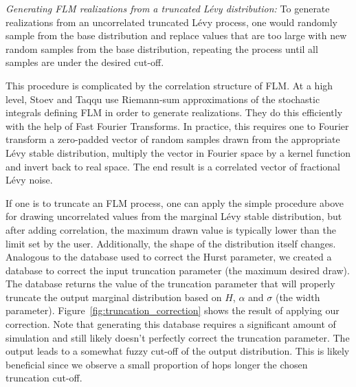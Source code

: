 \documentclass{article}
\begin{document}
  \textit{Generating FLM realizations from a truncated L\'evy distribution:}
  To generate realizations from an uncorrelated truncated L\'evy process, one would
  randomly sample from the base distribution and replace values that are too large
  with new random samples from the base distribution, repeating the process until
  all samples are under the desired cut-off. 
  
  This procedure is complicated by the correlation structure of FLM. At a high level,
  Stoev and Taqqu use Riemann-sum approximations of the stochastic integrals defining
  FLM in order to generate realizations. They do this efficiently with the help of 
  Fast Fourier Transforms. In practice, this requires one to Fourier transform a zero-padded
  vector of random samples drawn from the appropriate L\'evy stable distribution, multiply
  the vector in Fourier space by a kernel function and invert back to real space. The end
  result is a correlated vector of fractional L\'evy noise.
  
  If one is to truncate an FLM process, one can apply the simple procedure above for 
  drawing uncorrelated values from the marginal L\'evy stable distribution, but after
  adding correlation, the maximum drawn value is typically lower than the limit set 
  by the user. Additionally, the shape of the distribution itself changes. Analogous
  to the database used to correct the Hurst parameter, we created a database to 
  correct the input truncation parameter (the maximum desired draw). The database
  returns the value of the truncation parameter that will properly truncate the
  output marginal distribution based on $H$, $\alpha$ and $\sigma$ (the width parameter).
  Figure~\ref{fig:truncation_correction} shows the result of applying our correction.
  Note that generating this database requires a significant amount of simulation and
  still likely doesn't perfectly correct the truncation parameter. The output leads
  to a somewhat fuzzy cut-off of the output distribution. This is likely beneficial
  since we observe a small proportion of hops longer the chosen truncation cut-off.
  
\end{document}
